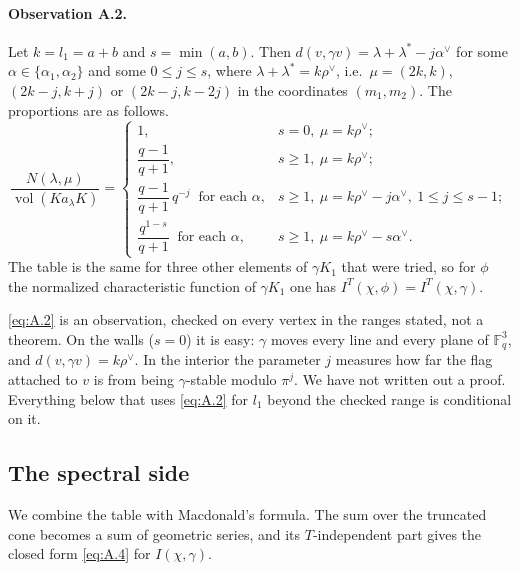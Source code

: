 \documentclass[12pt,letterpaper]{article}
\makeatletter
\numberwithin{equation}{section}
\theoremstyle{plain}
\theoremstyle{remark}
\theoremstyle{plain}
\theoremstyle{definition}
\theoremstyle{remark}
\newcommand{\fixedlabel}[1]{\phantomsection\def\@currentlabel{#1}}
\theoremstyle{remark}
\DeclareMathOperator{\vol}{vol}
\makeatother
\begin{document}
\paragraph{Observation A.2.}\fixedlabel{A.2}\label{obs:A.2} Let $k=l_1=a+b$ and $s=\min(a,b)$. Then $d(v,\gamma v)=\lambda+\lambda^*-j\alpha^\vee$ for some $\alpha\in\{\alpha_1,\alpha_2\}$ and some $0\le j\le s$, where $\lambda+\lambda^*=k\rho^\vee$, i.e.\ $\mu=(2k,k)$, $(2k-j,k+j)$ or $(2k-j,k-2j)$ in the coordinates $(m_1,m_2)$. The proportions are as follows.
\begin{equation}\label{eq:A.2}
\frac{N(\lambda,\mu)}{\vol(Ka_\lambda K)}=
\begin{cases}
1, & s=0,\ \mu=k\rho^\vee;\\[0.5ex]
\dfrac{q-1}{q+1}, & s\ge1,\ \mu=k\rho^\vee;\\[1.5ex]
\dfrac{q-1}{q+1}\,q^{-j}\ \text{ for each }\alpha, & s\ge1,\ \mu=k\rho^\vee-j\alpha^\vee,\ 1\le j\le s-1;\\[1.5ex]
\dfrac{q^{1-s}}{q+1}\ \text{ for each }\alpha, & s\ge1,\ \mu=k\rho^\vee-s\alpha^\vee.
\end{cases}
\end{equation}
The table is the same for three other elements of $\gamma K_1$ that were tried, so for $\phi$ the normalized characteristic function of $\gamma K_1$ one has $I^T(\chi,\phi)=I^T(\chi,\gamma)$.

\begin{rem26}\label{r:C2}
\eqref{eq:A.2} is an observation, checked on every vertex in the ranges stated, not a theorem. On the walls ($s=0$) it is easy: $\gamma$ moves every line and every plane of $\mathbb{F}_q^3$, and $d(v,\gamma v)=k\rho^\vee$. In the interior the parameter $j$ measures how far the flag attached to $v$ is from being $\gamma$-stable modulo $\pi^{j}$. We have not written out a proof. Everything below that uses \eqref{eq:A.2} for $l_1$ beyond the checked range is conditional on it.
\end{rem26}

\subsection{The spectral side}\label{sec:A.3}

We combine the table with Macdonald's formula. The sum over the truncated cone becomes a sum of geometric series, and its $T$-independent part gives the closed form \eqref{eq:A.4} for $I(\chi,\gamma)$.
\end{document}

